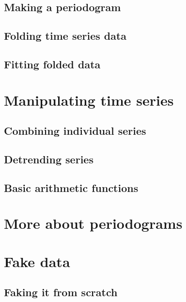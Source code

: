 \documentclass[twoside,11pt]{article}
\newcommand{\xlabel}[1]{}
\renewcommand{\_}{\texttt{\symbol{95}}}
\begin{document}
\subsection{Making a periodogram\xlabel{making_a_periodogram}}

\subsection{Folding time series data\xlabel{folding_data}}

\subsection{Fitting folded data\xlabel{fitting_data}}

\section{Manipulating time series\xlabel{manipulating_time_series}}

\subsection{Combining individual series\xlabel{combing_time_series}}

\subsection{Detrending series\xlabel{detrending_time_series}}

\subsection{Basic arithmetic functions\xlabel{basic_arithmetic}}

\section{More about periodograms\xlabel{more_periodograms}}


\section{Fake data\xlabel{fake_data}}

\subsection{Faking it from scratch\xlabel{fake_from_scratch}}
\end{document}
